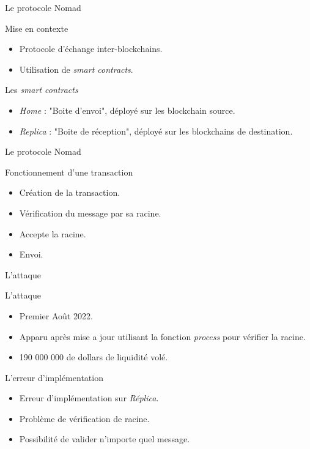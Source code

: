 \begin{frame}{Le protocole Nomad}
    \begin{block}{Mise en contexte}
        \begin{itemize}
            \item Protocole d'échange inter-blockchains.
            \item Utilisation de \textit{smart contracts}.
        \end{itemize}
    \end{block}
    \pause
    \begin{block}{Les \textit{smart contracts}}
        \begin{itemize}
            \item \textit{Home} : "Boite d'envoi", déployé sur les blockchain source.
            \item \textit{Replica} : "Boite de réception", déployé sur les blockchains de destination.
        \end{itemize}
    \end{block}
\end{frame}

\begin{frame}{Le protocole Nomad}
    \begin{block}{Fonctionnement d'une transaction}
        \begin{itemize}
            \item Création de la transaction.
            \item Vérification du message par sa racine.
            \item Accepte la racine.
            \item Envoi.
        \end{itemize}
    \end{block}
\end{frame}

\begin{frame}{L'attaque}
    \begin{block}{L'attaque}
        \begin{itemize}
            \item Premier Août 2022.
            \item Apparu après mise a jour utilisant la fonction \textit{process} pour vérifier la racine.
            \item 190 000 000 de dollars de liquidité volé.
        \end{itemize}
    \end{block}
    \pause
    \begin{block}{L'erreur d'implémentation}
        \begin{itemize}
            \item Erreur d'implémentation sur \textit{Réplica}.
            \item Problème de vérification de racine.
            \item Possibilité de valider n'importe quel message.
        \end{itemize}
    \end{block}
\end{frame}

